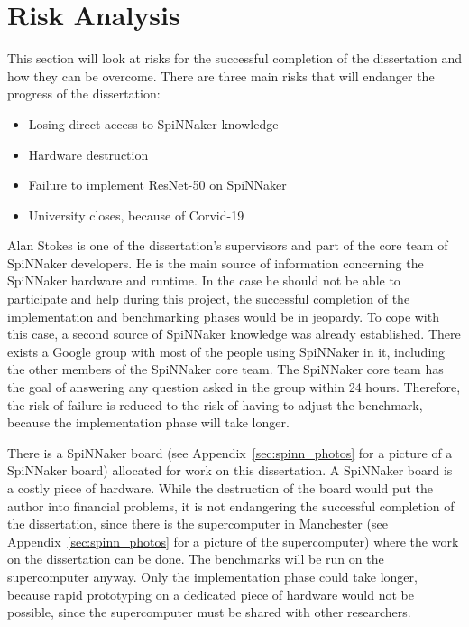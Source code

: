 \documentclass{article}
\begin{document}

\section{Risk Analysis} %
\label{sec:risk_analysis}

This section will look at risks for the successful
completion of the dissertation and how they can be
overcome.
There are three main risks that will endanger the progress
of the dissertation:
\begin{itemize}
  \item Losing direct access to SpiNNaker knowledge
  \item Hardware destruction
  \item Failure to implement ResNet-50 on SpiNNaker
  \item University closes, because of Corvid-19
\end{itemize}

Alan Stokes is one of the dissertation's supervisors and part
of the core team of SpiNNaker developers.
He is the main source of information concerning the
SpiNNaker hardware and runtime.
In the case he should not be able to participate and help
during this project, the successful completion of the implementation
and benchmarking phases would be in jeopardy.
To cope with this case, a second source of SpiNNaker knowledge was
already established.
There exists a Google group with most of the people using SpiNNaker in
it, including the other members of the SpiNNaker core team.
The SpiNNaker core team has the goal of answering any question asked
in the group within 24 hours.
Therefore, the risk of failure is reduced to the risk of having to
adjust the benchmark, because the implementation phase will take
longer.

There is a SpiNNaker board (see
Appendix~\ref{sec:spinn_photos} for a picture of a
SpiNNaker board) allocated for work on this dissertation.
A SpiNNaker board is a costly piece of hardware.
While the destruction of the board would put the author
into financial problems, it is not endangering the
successful completion of the dissertation, since there is
the supercomputer in Manchester (see
Appendix~\ref{sec:spinn_photos} for a picture of the
supercomputer) where the work on the dissertation can be
done.
The benchmarks will be run on the supercomputer anyway.
Only the implementation phase could take longer, because
rapid prototyping on a dedicated piece of hardware would
not be possible, since the supercomputer must be shared
with other researchers.
\end{document}
